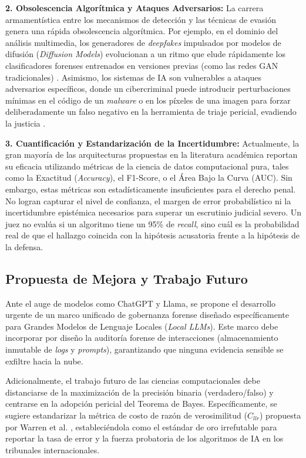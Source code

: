 \documentclass[journal]{IEEEtran}
\begin{document}
\textbf{2. Obsolescencia Algorítmica y Ataques Adversarios:} La carrera armamentística entre los mecanismos de detección y las técnicas de evasión genera una rápida obsolescencia algorítmica. Por ejemplo, en el dominio del análisis multimedia, los generadores de \textit{deepfakes} impulsados por modelos de difusión (\textit{Diffusion Models}) evolucionan a un ritmo que elude rápidamente los clasificadores forenses entrenados en versiones previas (como las redes GAN tradicionales) \cite{BharatiNitu2026EddA}. Asimismo, los sistemas de IA son vulnerables a ataques adversarios específicos, donde un cibercriminal puede introducir perturbaciones mínimas en el código de un \textit{malware} o en los píxeles de una imagen para forzar deliberadamente un falso negativo en la herramienta de triaje pericial, evadiendo la justicia \cite{MaccaroneLeeT.2025IACi}.

\textbf{3. Cuantificación y Estandarización de la Incertidumbre:} Actualmente, la gran mayoría de las arquitecturas propuestas en la literatura académica reportan su eficacia utilizando métricas de la ciencia de datos computacional pura, tales como la Exactitud (\textit{Accuracy}), el F1-Score, o el Área Bajo la Curva (AUC). Sin embargo, estas métricas son estadísticamente insuficientes para el derecho penal. No logran capturar el nivel de confianza, el margen de error probabilístico ni la incertidumbre epistémica necesarios para superar un escrutinio judicial severo. Un juez no evalúa si un algoritmo tiene un 95\% de \textit{recall}, sino cuál es la probabilidad real de que el hallazgo coincida con la hipótesis acusatoria frente a la hipótesis de la defensa.

\subsection{Propuesta de Mejora y Trabajo Futuro}
Ante el auge de modelos como ChatGPT y Llama, se propone el desarrollo urgente de un marco unificado de gobernanza forense diseñado específicamente para Grandes Modelos de Lenguaje Locales (\textit{Local LLMs}). Este marco debe incorporar por diseño la auditoría forense de interacciones (almacenamiento inmutable de \textit{logs} y \textit{prompts}), garantizando que ninguna evidencia sensible se exfiltre hacia la nube.

Adicionalmente, el trabajo futuro de las ciencias computacionales debe distanciarse de la maximización de la precisión binaria (verdadero/falso) y centrarse en la adopción pericial del Teorema de Bayes. Específicamente, se sugiere estandarizar la métrica de costo de razón de verosimilitud ($C_{llr}$) propuesta por Warren et al. \cite{WarrenEricM.2025Ceal}, estableciéndola como el estándar de oro irrefutable para reportar la tasa de error y la fuerza probatoria de los algoritmos de IA en los tribunales internacionales.
\end{document}
